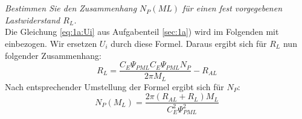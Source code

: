 \section{}\label{sec:1c}
\textit{Bestimmen Sie den Zusammenhang $ N_{P}(ML) $ für einen fest vorgegebenen Lastwiderstand $ R_{L} $.}\\
Die Gleichung \ref{eq:1a:Ui} aus Aufgabenteil \ref{sec:1a}) wird im Folgenden mit einbezogen. Wir ersetzen $ U_{i} $ durch diese Formel. Daraus ergibt sich für $ R_{L} $ nun folgender Zusammenhang:
\begin{equation}
	R_{L} = \frac{C_{E}\Psi_{PML}C_{E}\Psi_{PML}N_{P}}{2\pi M_{L}} - R_{AL}
	\label{eq:1c:RL}
\end{equation}
Nach entsprechender Umstellung der Formel ergibt sich für $ N_{P} $:
\begin{equation}
	N_{P}(M_{L}) = \frac{2\pi (R_{AL}+R_{L})M_{L}}{C_{E}^{2}\Psi_{PML}^{2}}
	\label{eq:1c:NP}
\end{equation}






